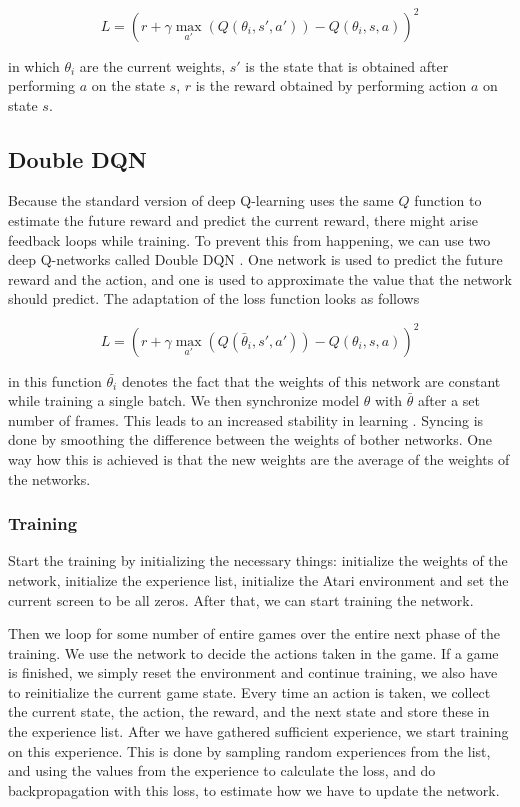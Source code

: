 \documentclass{article}
\begin{document}
\[
	L = \left(r + \gamma \max_{a'}( Q(\theta_i, s',a')) - Q(\theta_i, s, a)\right)^2
\]

in which $\theta_i$ are the current weights, $s'$ is the state that is obtained after performing $a$ on the state $s$, $r$ is the reward obtained by performing action $a$ on state $s$.

\subsection{Double DQN} \label{sec:doubleDQN}

Because the standard version of deep Q-learning uses the same $Q$ function to estimate the future reward and predict the current reward, there might arise feedback loops while training. To prevent this from happening, we can use two deep Q-networks called Double DQN \cite{van2016deep}. One network is used to predict the future reward and the action, and one is used to approximate the value that the network should predict. The adaptation of the loss function looks as follows

\[
	L = \left(r + \gamma \max_{a'}( Q(\bar\theta_i, s',a')) - Q(\theta_i, s, a)\right)^2
\]

in this function $\bar{\theta_i}
$ denotes the fact that the weights of this network are constant while training a single batch. 
We then synchronize model $\theta$ with $\bar\theta$ after a set number of frames. This leads to an increased stability in learning \cite{van2016deep}. Syncing is done by smoothing the difference between the weights of bother networks. One way how this is achieved is that the new weights are the average of the weights of the networks.


\subsubsection{Training}
Start the training by initializing the necessary things: initialize the weights of the network, initialize the experience list, initialize the Atari environment and set the current screen to be all zeros. After that, we can start training the network. 

Then we loop for some number of entire games over the entire next phase of the training. We use the network to decide the actions taken in the game. If a game is finished, we simply reset the environment and continue training, we also have to reinitialize the current game state. Every time an action is taken, we collect the current state, the action, the reward, and the next state and store these in the experience list. After we have gathered sufficient experience, we start training on this experience. This is done by sampling random experiences from the list, and using the values from the experience to calculate the loss, and do backpropagation with this loss, to estimate how we have to update the network. 
\end{document}
